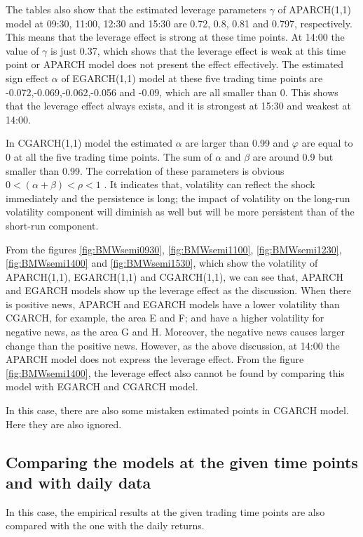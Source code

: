 The tables also show that the estimated leverage parameters $\gamma$ of APARCH(1,1) model at 09:30, 11:00, 12:30 and 15:30 are 0.72, 0.8, 0.81 and 0.797, respectively. This means that the leverage effect is strong at these time points. At 14:00 the value of $\gamma$ is just 0.37, which shows that the leverage effect is weak at this time point or APARCH model does not present the effect effectively. The estimated sign effect $\alpha$ of EGARCH(1,1) model at these five trading time points are -0.072,-0.069,-0.062,-0.056 and -0.09, which are all smaller than 0. This shows that the leverage effect always exists, and it is strongest at 15:30 and weakest at 14:00.

In CGARCH(1,1) model the estimated $\alpha$ are larger than 0.99 and $\varphi$ are equal to 0 at all the five trading time points. The sum of $\alpha$ and $\beta$ are around 0.9 but smaller than 0.99. The correlation of these parameters is obvious $0 < (\alpha + \beta) < \rho <1$ . It indicates that, volatility can reflect the shock immediately and the persistence is long; the impact of volatility on the long-run volatility component will diminish as well but will be more persistent than of the short-run component.

From the figures \ref{fig:BMWsemi0930}, \ref{fig:BMWsemi1100}, \ref{fig:BMWsemi1230}, \ref{fig:BMWsemi1400} and \ref{fig:BMWsemi1530}, which show the volatility of APARCH(1,1), EGARCH(1,1) and CGARCH(1,1), we can see that, APARCH and EGARCH models show up the leverage effect as the discussion. When there is positive news, APARCH and EGARCH models have a lower volatility than CGARCH, for example, the area E and F; and have a higher volatility for negative news, as the area G and H. Moreover, the negative news causes larger change than the positive news. However, as the above discussion, at 14:00 the APARCH model does not express the leverage effect. From the figure \ref{fig:BMWsemi1400}, the leverage effect also cannot be found by comparing this model with EGARCH and CGARCH model.

In this case, there are also some mistaken estimated points in CGARCH model. Here they are also ignored.

\subsection{Comparing the models at the given time points and with daily data}

In this case, the empirical results at the given trading time points are also compared with the one with the daily returns.


